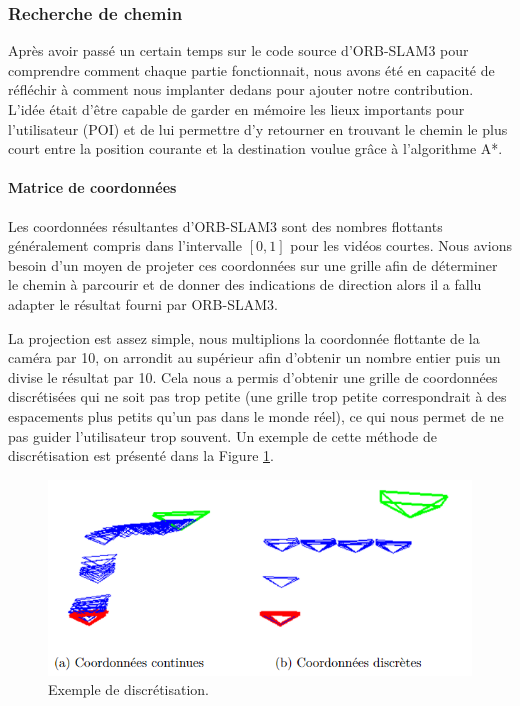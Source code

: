\documentclass[11pt]{article}
\begin{document}
      \subsubsection{Recherche de chemin}
        Après avoir passé un certain temps sur le code source d'ORB-SLAM3 pour comprendre comment chaque partie fonctionnait, nous avons
        été en capacité de réfléchir à comment nous implanter dedans pour ajouter notre contribution. L'idée était d'être capable de garder
        en mémoire les lieux importants pour l'utilisateur (POI) et de lui permettre d'y retourner en trouvant le chemin le plus court
        entre la position courante et la destination voulue grâce à l'algorithme A*.    

        \paragraph{Matrice de coordonnées}
          Les coordonnées résultantes d'ORB-SLAM3 sont des nombres flottants généralement compris dans l'intervalle $[0,1]$ pour les vidéos
          courtes. Nous avions besoin d'un moyen de projeter ces coordonnées sur une grille afin de déterminer le chemin à parcourir
          et de donner des indications de direction alors il a fallu adapter le résultat fourni par ORB-SLAM3.

         La projection est assez simple, nous multiplions la coordonnée flottante de la caméra par 10, on arrondit au supérieur afin d'obtenir
         un nombre entier puis un divise le résultat par 10. Cela nous a permis d'obtenir une grille de coordonnées discrétisées qui ne soit
         pas trop petite (une grille trop petite correspondrait à des espacements plus petits qu'un pas dans le monde réel), ce qui nous permet
         de ne pas guider l'utilisateur trop souvent. Un exemple de cette méthode de discrétisation est présenté dans la Figure 
         \ref{fig:Coordonnees}.

         \begin{figure}[hbt]  
          \includegraphics[width=\textwidth]{Coordonnees.png}    
          \caption{Exemple de discrétisation.}
          \label{fig:Coordonnees}
        \end{figure}  
        
\end{document}
